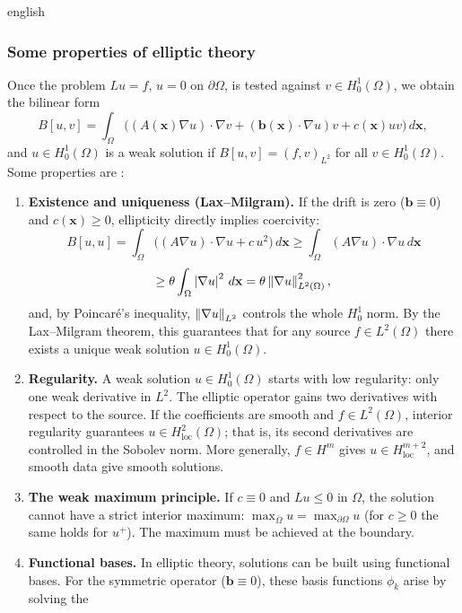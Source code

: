 \documentclass[0000.tex]{subfiles}
\begin{document}
\begin{hyphenrules}{english}
\subsubsection{Some properties of elliptic theory}
Once the problem $Lu=f$, $u=0$ on $\partial\Omega$, is tested against $v\in H^1_0(\Omega)$, we obtain
the bilinear form
\begin{equation}
  B[u,v]=\int_\Omega\Big((A(\mathbf{x})\nabla u)\cdot\nabla v+(\mathbf{b}(\mathbf{x})\cdot\nabla u)v+c(\mathbf{x})uv\Big)\,d\mathbf{x},
  \label{eq:elliptic-bilinear}
\end{equation}
and $u\in H^1_0(\Omega)$ is a weak solution if $B[u,v]=(f,v)_{L^2}$ for all $v\in H^1_0(\Omega)$. Some
properties are \cite{evans2010}:
\begin{enumerate}
  \item \textbf{Existence and uniqueness (Lax--Milgram).} If the drift is zero ($\mathbf{b}\equiv0$) and
    $c(\mathbf{x})\ge0$, ellipticity directly implies coercivity:
    \[
      B[u,u]=\int_\Omega\big((A\nabla u)\cdot\nabla u+c\,u^2\big)\,d\mathbf{x}
      \ge\int_\Omega(A\nabla u)\cdot\nabla u\,d\mathbf{x}
    \]
    \[
      \ge\theta\int_\Omega\left\lvert \nabla u \right\rvert^2\,d\mathbf{x}=\theta\left\lVert \nabla u \right\rVert_{L^2(\Omega)}^2,
    \]
    and, by Poincaré's inequality, $\left\lVert \nabla u \right\rVert_{L^2}$ controls the whole $H^1_0$ norm. By the
    Lax--Milgram theorem, this guarantees that for any source $f\in L^2(\Omega)$ there exists a unique
    weak solution $u\in H^1_0(\Omega)$.
  \item \textbf{Regularity.} A weak solution $u\in H^1_0(\Omega)$ starts with low regularity: only one
    weak derivative in $L^2$. The elliptic operator gains two derivatives with respect to the source. If
    the coefficients are smooth and $f\in L^2(\Omega)$, interior regularity guarantees
    $u\in H^2_{\mathrm{loc}}(\Omega)$; that is, its second derivatives are controlled in the Sobolev norm.
    More generally, $f\in H^m$ gives $u\in H^{m+2}_{\mathrm{loc}}$, and smooth data give smooth solutions.
  \item \textbf{The weak maximum principle.} If $c\equiv0$ and $Lu\le0$ in $\Omega$, the solution
    cannot have a strict interior maximum: $\max_{\bar\Omega}u=\max_{\partial\Omega}u$ (for $c\ge0$ the
    same holds for $u^+$). The maximum must be achieved at the boundary.
  \item \textbf{Functional bases.} In elliptic theory, solutions can be built using functional bases.
    For the symmetric operator ($\mathbf{b}\equiv0$), these basis functions $\phi_k$ arise by solving the

\end{enumerate}
\end{hyphenrules}
\end{document}
